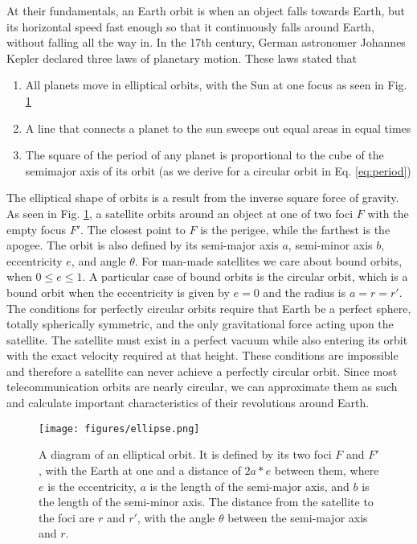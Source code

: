 \documentclass[10pt]{article}
\begin{document}
At their fundamentals, an Earth orbit is when an object falls towards Earth, but its horizontal speed fast enough so that it continuously falls around Earth, without falling all the way in. In the 17th century, German astronomer Johannes Kepler declared three laws of planetary motion. These laws stated that

\begin{enumerate}
    \item All planets move in elliptical orbits, with the Sun at one focus as seen in Fig. \ref{fig:ellipse}
    \label{first law}
    \item A line that connects a planet to the sun sweeps out equal areas in equal times
    \label{second law}
    \item The square of the period of any planet is proportional to the cube of the semimajor axis of its orbit (as we derive for a circular orbit in Eq. \ref{eq:period})
    \label{third law}
\end{enumerate}

The elliptical shape of orbits is a result from the inverse square force of gravity. As seen in Fig. \ref{fig:ellipse}, a satellite orbits around an object at one of two foci $F$ with the empty focus $F'$. The closest point to $F$ is the perigee, while the farthest is the apogee. The orbit is also defined by its semi-major axis $a$, semi-minor axis $b$, eccentricity $e$, and angle $\theta$. For man-made satellites we care about bound orbits, when $0 \leq e \leq 1$. A particular case of bound orbits is the circular orbit, which is a bound orbit when the eccentricity is given by $e=0$ and the radius is $a=r=r'$. The conditions for perfectly circular orbits require that Earth be a perfect sphere, totally spherically symmetric, and the only gravitational force acting upon the satellite. The satellite must exist in a perfect vacuum while also entering its orbit with the exact velocity required at that height. These conditions are impossible and therefore a satellite can never achieve a perfectly circular orbit. Since most telecommunication orbits are nearly circular, we can approximate them as such and calculate important characteristics of their revolutions around Earth. 

\begin{figure}[h!]
\centering
\texttt{[image: figures/ellipse.png]}
\caption{A diagram of an elliptical orbit. It is defined by its two foci $F$ and $F'$, with the Earth at one and a distance of $2a*e$ between them, where $e$ is the eccentricity, $a$ is the length of the semi-major axis, and $b$ is the length of the semi-minor axis. The distance from the satellite to the foci are $r$ and $r'$, with the angle $\theta$ between the semi-major axis and $r$.}
\label{fig:ellipse}
\end{figure}
\end{document}
